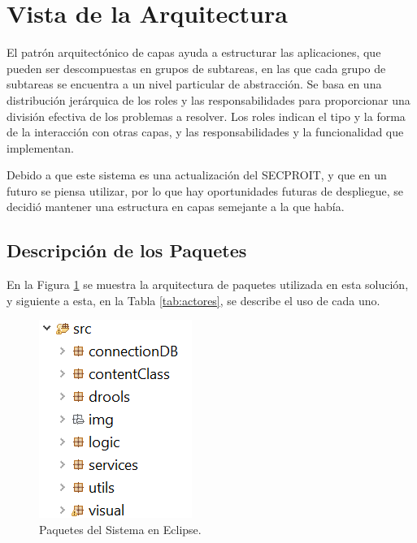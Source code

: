 
\section{Vista de la Arquitectura}
El patrón arquitectónico de capas ayuda a estructurar las aplicaciones, que pueden ser descompuestas en grupos de subtareas, en las que cada grupo de subtareas se encuentra a un nivel particular de abstracción. Se basa en una distribución jerárquica de los roles y las responsabilidades para proporcionar una división efectiva de los problemas a resolver. Los roles indican el tipo y la forma de la interacción con otras capas, y las responsabilidades y la funcionalidad que implementan.

Debido a que este sistema es una actualización del SECPROIT, y que en un futuro se piensa utilizar, por lo que hay oportunidades futuras de despliegue, se decidió mantener una estructura en capas semejante a la que había.

\subsection{Descripción de los Paquetes}
En la Figura \ref{fig:paquetes} se muestra la arquitectura de paquetes utilizada en esta solución, y siguiente a esta, en la Tabla \ref{tab:actores}, se describe el uso de cada uno.

\begin{figure}[h]
\centering
 \includegraphics[width=0.143\linewidth]{imagen/estructura.png}
 \caption{Paquetes del Sistema en Eclipse.}
 \label{fig:paquetes} 
\end{figure}

